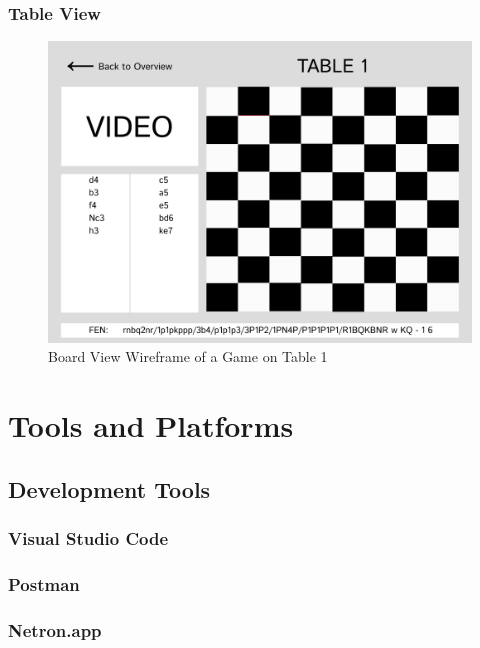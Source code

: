 \subsubsection*{Table View}
\label{subsubsec:table-view}

\begin{figure}[h!]
    \centering
    \includegraphics[width=0.75\linewidth]{figures/wireframe/table-view.png}
    \caption[Board View Wireframe of a Game on Table 1]{Board View Wireframe of a Game on Table 1}
    \label{fig:app-table-view}
\end{figure}

\section{Tools and Platforms}
\label{sec:tools-and-platforms}

\subsection{Development Tools}
\label{subsec:development-tools}

\subsubsection*{Visual Studio Code}
\label{subsubsec:visual-studio-code}

\subsubsection*{Postman}
\label{subsubsec:postman}

\subsubsection*{Netron.app}
\label{subsubsec:natron}

